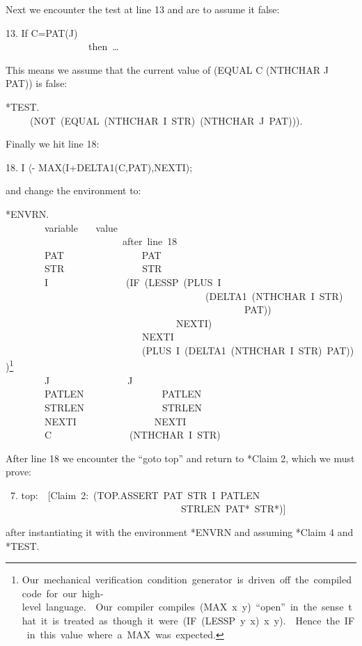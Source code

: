 \documentclass[10pt]{book}
\newenvironment{pubasis}{\begin{flushleft}}{\end{flushleft}}
\begin{document}
Next we encounter the test at line 13 and are to assume it false:
\begin{pubasis}
13.	      If C=PAT(J)\\
~~~~~~~~~~~~~~~~~then~\ldots{}\\
\end{pubasis}
This means we assume that the current value of (EQUAL C
(NTHCHAR J PAT)) is false: 
\begin{pubasis}
*TEST.\\
~~~~~(NOT~(EQUAL~(NTHCHAR~I~STR)~(NTHCHAR~J~PAT))).\\
\end{pubasis}
Finally we hit line 18:
\begin{pubasis}
18.	      I $\langle$- MAX(I+DELTA1(C,PAT),NEXTI);\\
\end{pubasis}
and change the environment to:
\begin{pubasis}
*ENVRN.\\
~~~~~~~~variable	~~~value\\
~~~~~~~~~~~~~~~~~~~~~~~~after~line~18\\

~~~~~~~~PAT~~~~~~~~~~~~~~~~PAT\\
~~~~~~~~STR~~~~~~~~~~~~~~~~STR\\
~~~~~~~~I~~~~~~~~~~~~~~~~(IF~(LESSP~(PLUS~I\\
~~~~~~~~~~~~~~~~~~~~~~~~~~~~~~~~~~~~~~~~~(DELTA1~(NTHCHAR~I~STR)\\
~~~~~~~~~~~~~~~~~~~~~~~~~~~~~~~~~~~~~~~~~~~~~~~~~PAT))\\
~~~~~~~~~~~~~~~~~~~~~~~~~~~~~~~~~~~NEXTI)\\
~~~~~~~~~~~~~~~~~~~~~~~~~~~~NEXTI\\
~~~~~~~~~~~~~~~~~~~~~~~~~~~~(PLUS~I~(DELTA1~(NTHCHAR~I~STR)~PAT)))\footnote{Our~mechanical~verification~condition~generator~is~driven~off~the~compiled~code~for~our~high-level~language.~~Our~compiler~compiles~(MAX~x~y)~``open''~in~the~sense~that~it~is~treated~as~though~it~were~(IF~(LESSP~y~x)~x~y).~~Hence~the~IF~in~this~value~where~a~MAX~was~expected.}\\

~~~~~~~~J~~~~~~~~~~~~~~~~J\\
~~~~~~~~PATLEN~~~~~~~~~~~~~~~~PATLEN\\
~~~~~~~~STRLEN~~~~~~~~~~~~~~~~STRLEN\\
~~~~~~~~NEXTI~~~~~~~~~~~~~~~~NEXTI\\
~~~~~~~~C~~~~~~~~~~~~~~~~(NTHCHAR~I~STR)\\
\end{pubasis}
After line 18 we encounter the ``goto top'' and return to *Claim 2,
which we must prove:
\begin{pubasis}
~7.	top:~~{[}Claim~2:~(TOP.ASSERT~PAT~STR~I~PATLEN\\
~~~~~~~~~~~~~~~~~~~~~~~~~~~~~~~~~~~~STRLEN~PAT*~STR*)]\\
\end{pubasis}
after instantiating it  with the environment *ENVRN and assuming *Claim 4 and *TEST.
\end{document}
